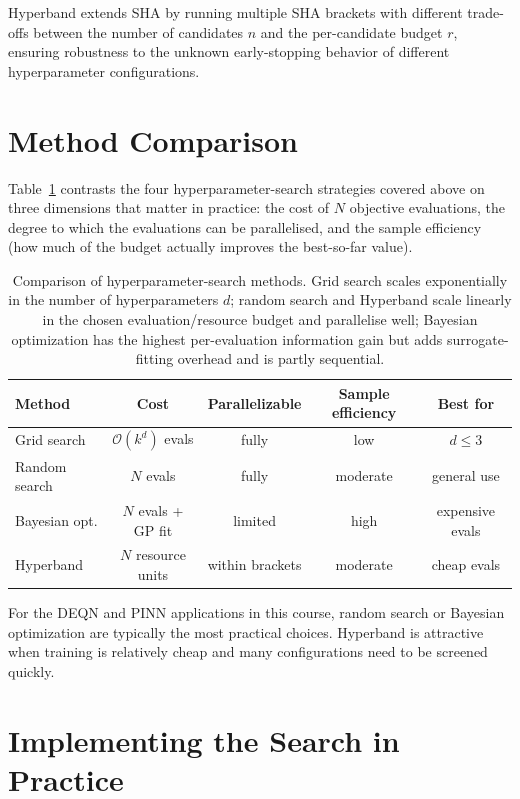 \documentclass[11pt,a4paper]{report}
\begin{document}
Hyperband extends SHA by running multiple SHA brackets with different trade-offs between the number of candidates $n$ and the per-candidate budget $r$, ensuring robustness to the unknown early-stopping behavior of different hyperparameter configurations.

\section{Method Comparison}

Table~\ref{tab:nas_methods} contrasts the four hyperparameter-search strategies covered above on three dimensions that matter in practice: the cost of $N$ objective evaluations, the degree to which the evaluations can be parallelised, and the sample efficiency (how much of the budget actually improves the best-so-far value).

\begin{table}[ht]
\centering
\small
\begin{tabular}{l c c c c}
\toprule
\textbf{Method} & \textbf{Cost} & \textbf{Parallelizable} & \textbf{Sample efficiency} & \textbf{Best for} \\
\midrule
Grid search & $\mathcal{O}(k^d)$ evals & fully & low & $d \leq 3$ \\
Random search & $N$ evals & fully & moderate & general use \\
Bayesian opt. & $N$ evals + GP fit & limited & high & expensive evals \\
Hyperband & $N$ resource units & within brackets & moderate & cheap evals \\
\bottomrule
\end{tabular}
\caption{Comparison of hyperparameter-search methods.  Grid search scales exponentially in the number of hyperparameters $d$; random search and Hyperband scale linearly in the chosen evaluation/resource budget and parallelise well; Bayesian optimization has the highest per-evaluation information gain but adds surrogate-fitting overhead and is partly sequential.}
\label{tab:nas_methods}
\end{table}

For the DEQN and PINN applications in this course, random search or Bayesian optimization are typically the most practical choices.  Hyperband is attractive when training is relatively cheap and many configurations need to be screened quickly.

\section{Implementing the Search in Practice}
\label{sec:nas-implementation}
\end{document}
